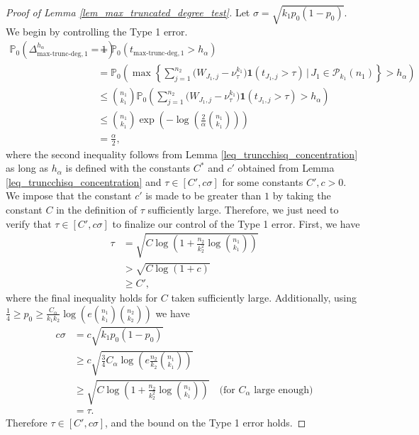 \documentclass{article}
\newcommand{\bbP}{\mathbb{P}}
\newcommand{\one}{\mathbf{1}}
\newcommand{\chisqmax}{\text{max-trunc-deg}}
\begin{document}
\begin{proof}[Proof of Lemma \ref{lem_max_truncated_degree_test}]
    Let $\sigma = \sqrt{k_1p_0(1-p_0)}$. We begin by controlling the Type 1 error.
    \begin{align*}
        \bbP_0 (\Delta^{h_\alpha}_{\chisqmax, 1} = 1) &= \bbP_0(t_{\chisqmax,1} > h_\alpha) \\
        &= \bbP_0\left(\max \left\{\sum_{j = 1}^{n_2}\big(W_{J_1,j} - \nu^{k_1}_{\tau}\big)\one(t_{J_1, j} > \tau)\,\Big|\, J_1 \in \mathcal{P}_{k_1}(n_1)\right\} > h_\alpha \right) \\
        &\leq {n_1 \choose k_1} \bbP_0\left(\sum_{j = 1}^{n_2}\big(W_{J_1,j} - \nu^{k_1}_{\tau}\big)\one(t_{J_1, j} > \tau) > h_\alpha\right) \\
        &\leq {n_1 \choose k_1}\exp\left(-\log\left(\frac{2}{\alpha}{n_1 \choose k_1}\right)\right) \\
        &= \frac{\alpha}{2},
    \end{align*}
    where the second inequality follows from Lemma \ref{leq_truncchisq_concentration} as long as $h_\alpha$ is defined with the constants $C^*$ and $c'$ obtained from Lemma \ref{leq_truncchisq_concentration} and $\tau \in [C', c\sigma]$ for some constants $C', c > 0$. We impose that the constant $c'$ is made to be greater than $1$ by taking the constant $C$ in the definition of $\tau$ sufficiently large. Therefore, we just need to verify that $\tau \in [C', c\sigma]$ to finalize our control of the Type 1 error. First, we have
    \begin{align*}
        \tau &= \sqrt{C\log\left(1 + \frac{n_2}{k_2^2}\log{n_1 \choose k_1}\right)} \\
        &> \sqrt{C\log\left(1 + c\right)} \\
        &\geq C',
    \end{align*}
    where the final inequality holds for $C$ taken sufficiently large. Additionally, using $\frac14 \geq p_0 \geq \frac{C_\alpha}{k_1k_2} \log\left(e{n_1 \choose k_1}{n_2 \choose k_2}\right)$ we have
    \begin{align*}
        c\sigma &= c\sqrt{k_1 p_0 (1 - p_0)} \\
        &\geq c\sqrt{\frac34 C_\alpha\log\left(e\frac{n_2}{k_2}{n_1 \choose k_1}\right)} \\
        &\geq \sqrt{C\log\left(1 + \frac{n_2}{k_2^2}\log{n_1 \choose k_1}\right)} \quad \text{(for $C_\alpha$ large enough)}\\
        &= \tau.
    \end{align*}
    Therefore  $\tau \in [C', c\sigma]$, and the bound on the Type 1 error holds. 


\end{proof}
\end{document}

